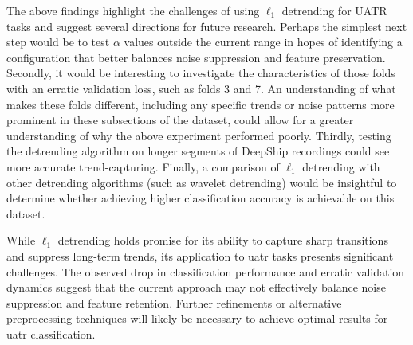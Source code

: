 The above findings highlight the challenges of using $\ell_1$ detrending for UATR tasks and suggest several directions for future research. Perhaps the simplest next step would be to test $\alpha$ values outside the current range in hopes of identifying a configuration that better balances noise suppression and feature preservation. Secondly, it would be interesting to investigate the characteristics of those folds with an erratic validation loss, such as folds 3 and 7. An understanding of what makes these folds different, including any specific trends or noise patterns more prominent in these subsections of the dataset, could allow for a greater understanding of why the above experiment performed poorly. Thirdly, testing the detrending algorithm on longer segments of DeepShip recordings could see more accurate trend-capturing. Finally, a comparison of $\ell_1$ detrending with other detrending algorithms (such as wavelet detrending) would be insightful to determine whether achieving higher classification accuracy is achievable on this dataset.

While $\ell_1$ detrending holds promise for its ability to capture sharp transitions and suppress long-term trends, its application to \acrshort{uatr} tasks presents significant challenges. The observed drop in classification performance and erratic validation dynamics suggest that the current approach may not effectively balance noise suppression and feature retention. Further refinements or alternative preprocessing techniques will likely be necessary to achieve optimal results for \acrshort{uatr} classification.





